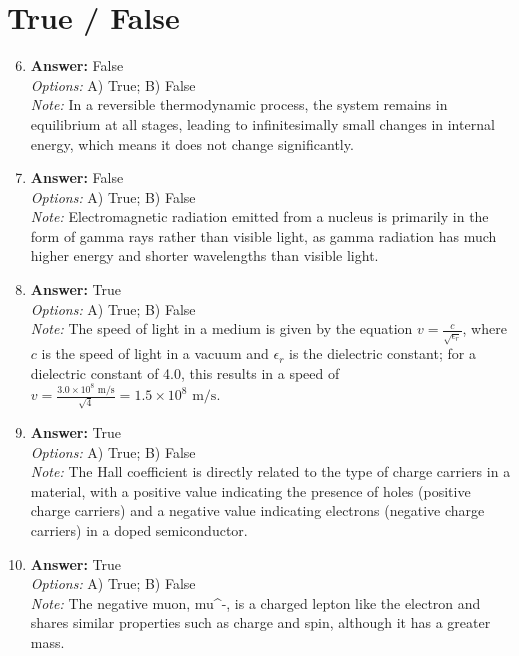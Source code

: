 \documentclass[12pt]{article}
\begin{document}
\section*{True / False}
\begin{enumerate}[label=\arabic*.]
\setcounter{enumi}{5}
\item \textbf{Answer:} False
\\ \textit{Options:} A) True; B) False
\\ \textit{Note:} In a reversible thermodynamic process, the system remains in equilibrium at all stages, leading to infinitesimally small changes in internal energy, which means it does not change significantly.
\item \textbf{Answer:} False
\\ \textit{Options:} A) True; B) False
\\ \textit{Note:} Electromagnetic radiation emitted from a nucleus is primarily in the form of gamma rays rather than visible light, as gamma radiation has much higher energy and shorter wavelengths than visible light.
\item \textbf{Answer:} True
\\ \textit{Options:} A) True; B) False
\\ \textit{Note:} The speed of light in a medium is given by the equation \( v = \frac{c}{\sqrt{\epsilon_r}} \), where \( c \) is the speed of light in a vacuum and \( \epsilon_r \) is the dielectric constant; for a dielectric constant of 4.0, this results in a speed of \( v = \frac{3.0 \times 10^8 \text{ m/s}}{\sqrt{4}} = 1.5 \times 10^8 \text{ m/s} \).
\item \textbf{Answer:} True
\\ \textit{Options:} A) True; B) False
\\ \textit{Note:} The Hall coefficient is directly related to the type of charge carriers in a material, with a positive value indicating the presence of holes (positive charge carriers) and a negative value indicating electrons (negative charge carriers) in a doped semiconductor.
\item \textbf{Answer:} True
\\ \textit{Options:} A) True; B) False
\\ \textit{Note:} The negative muon, mu^-, is a charged lepton like the electron and shares similar properties such as charge and spin, although it has a greater mass.
\end{enumerate}
\end{document}
